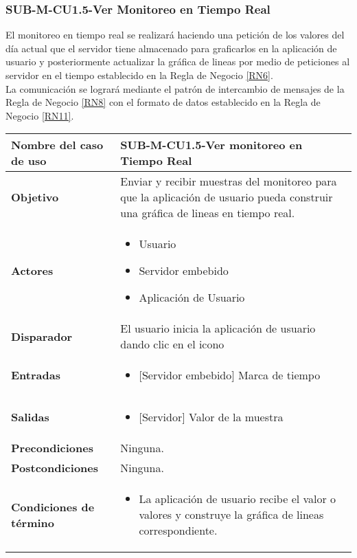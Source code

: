 \subsubsection{SUB-M-CU1.5-Ver Monitoreo en Tiempo Real}\label{SUB-M-CU1.5}
El monitoreo en tiempo real se realizará haciendo una petición de los valores del día actual que el servidor tiene almacenado para graficarlos en la aplicación de usuario y posteriormente actualizar la gráfica de lineas por medio de peticiones al servidor en el tiempo establecido en la Regla de Negocio \ref{RN6}.
\\ La comunicación se logrará mediante el patrón de intercambio de mensajes de la Regla de Negocio \ref{RN8} con el formato de datos establecido en la Regla de Negocio \ref{RN11}. 

\begin{longtable}{|J{5cm}|J{10.3cm}|}
	\hline
	\textbf{Nombre del caso de uso} &
		SUB-M-CU1.5-Ver monitoreo en Tiempo Real \\ \hline
	\textbf{Objetivo} &
		Enviar y recibir muestras del monitoreo para que la aplicación de usuario pueda construir una gráfica de lineas en tiempo real. \\ \hline
	\textbf{Actores} &
		\begin{itemize}
		    \item Usuario
			\item Servidor embebido
			\item Aplicación de Usuario
		\end{itemize} \\ \hline
	\textbf{Disparador} & 
	    El usuario inicia la aplicación de usuario dando clic en el icono \\ \hline 
	\textbf{Entradas} & 
		\begin{itemize}
				\item{[Servidor embebido]} Marca de tiempo
		\end{itemize}\\ \hline 
	\textbf{Salidas} & 
		\begin{itemize}
			\item{[Servidor]} Valor de la muestra
		\end{itemize} \\ \hline
	\textbf{Precondiciones} &
		Ninguna. \\ \hline
	\textbf{Postcondiciones} &
		Ninguna.\\ \hline
	\textbf{Condiciones de término} & 
		\begin{itemize}
			\item La aplicación de usuario recibe el valor o valores y construye la gráfica de lineas correspondiente.

\end{itemize}
\end{longtable}
